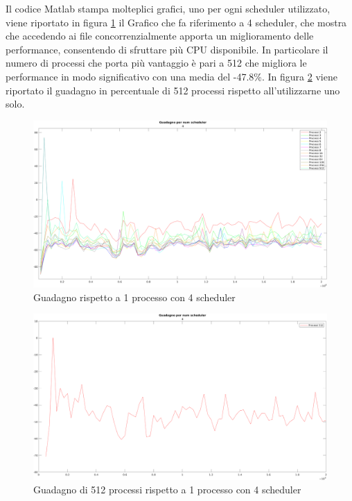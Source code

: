 Il codice Matlab stampa molteplici grafici, uno per ogni scheduler
utilizzato, viene riportato in figura \ref{fig:4_io_guadagno}
il Grafico che fa riferimento a 4 scheduler, che mostra che accedendo
ai file concorrenzialmente apporta un miglioramento delle performance,
consentendo di sfruttare più CPU disponibile.
In particolare il numero di processi che porta più vantaggio è
pari a 512 che migliora le performance in modo significativo
con una media del -47.8\%.
In figura \ref{fig:4_512_io_guadagno} viene riportato il guadagno
in percentuale di 512 processi rispetto all'utilizzarne uno solo.


\begin{figure}[!htp]
    \centering
    \includegraphics[keepaspectratio=true,scale=0.33]{images/matlab/io_guadagno/4_io_guadagno.png}
	\caption{Guadagno rispetto a 1 processo con 4 scheduler}
  	\label{fig:4_io_guadagno}
\end{figure}

\begin{figure}[!htp]
    \centering
    \includegraphics[keepaspectratio=true,scale=0.33]{images/matlab/io_guadagno/4_512_io_guadagno.png}
	\caption{Guadagno di 512 processi rispetto a 1 processo con 4 scheduler}
  	\label{fig:4_512_io_guadagno}
\end{figure}
